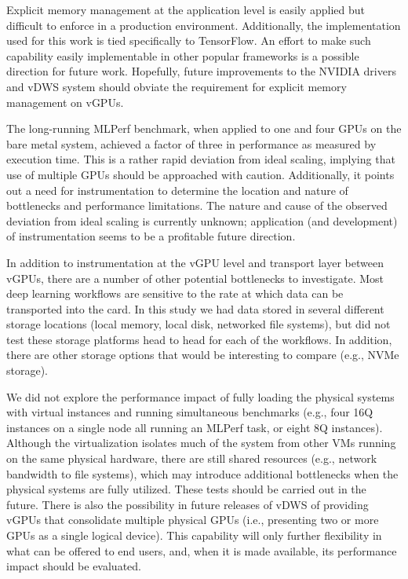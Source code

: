 \documentclass[conference]{IEEEtran}
\begin{document}
Explicit memory management at the application level is easily applied 
but difficult to enforce in a production environment. Additionally, the implementation used for this work is tied specifically to TensorFlow. An effort to make such capability easily implementable in other popular frameworks is a possible direction for future work. Hopefully, future improvements to the NVIDIA drivers and vDWS system should obviate the requirement for explicit memory management on vGPUs. 

The long-running MLPerf benchmark, when applied to one and four GPUs on the bare metal system, achieved a factor of three in performance as measured by execution time.
This is a rather rapid deviation from ideal scaling, implying that use of multiple GPUs should be approached with caution. Additionally, it points out a need for instrumentation to determine the location and nature of bottlenecks and performance limitations.
The nature and cause of the observed deviation from ideal scaling is currently unknown; application (and development) of instrumentation seems to be a profitable future direction.

In addition to instrumentation at the vGPU level and transport layer between vGPUs, there are a number of other potential bottlenecks to investigate. Most deep learning workflows are sensitive to the rate at which data can be transported into the card. In this study we had data stored in several different storage locations (local memory, local disk, networked file systems), but did not test these storage platforms head to head for each of the workflows. In addition, there are other storage options that would be interesting to compare (e.g., NVMe storage).

We did not explore the performance impact of fully loading the physical systems with virtual instances and running simultaneous benchmarks (e.g., four 16Q instances on a single node all running an MLPerf task, or eight 8Q instances). Although the virtualization isolates much of the system from other VMs running on the same physical hardware, there are still shared resources (e.g., network bandwidth to file systems), which may introduce additional bottlenecks when the physical systems are fully utilized. These tests should be carried out in the future. There is also the possibility in future releases of vDWS of providing vGPUs that consolidate multiple physical GPUs (i.e., presenting two or more GPUs as a single logical device). This capability will only further flexibility in what can be offered to end users, and, when it is made available, its performance impact should be evaluated.
\end{document}
